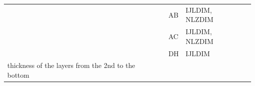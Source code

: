 \begin{longtable}[]{@{}lllll@{}}
\begin{minipage}[t]{0.44\columnwidth}\raggedright
\strut
\end{minipage} & \begin{minipage}[t]{0.15\columnwidth}\raggedright
\strut
\end{minipage} & \begin{minipage}[t]{0.07\columnwidth}\raggedright
AB\strut
\end{minipage} & \begin{minipage}[t]{0.10\columnwidth}\raggedright
IJLDIM, NLZDIM\strut
\end{minipage} & \begin{minipage}[t]{0.10\columnwidth}\raggedright
\strut
\end{minipage}\tabularnewline
\begin{minipage}[t]{0.44\columnwidth}\raggedright
\strut
\end{minipage} & \begin{minipage}[t]{0.15\columnwidth}\raggedright
\strut
\end{minipage} & \begin{minipage}[t]{0.07\columnwidth}\raggedright
AC\strut
\end{minipage} & \begin{minipage}[t]{0.10\columnwidth}\raggedright
IJLDIM, NLZDIM\strut
\end{minipage} & \begin{minipage}[t]{0.10\columnwidth}\raggedright
\strut
\end{minipage}\tabularnewline
\begin{minipage}[t]{0.44\columnwidth}\raggedright
\strut
\end{minipage} & \begin{minipage}[t]{0.15\columnwidth}\raggedright
\strut
\end{minipage} & \begin{minipage}[t]{0.07\columnwidth}\raggedright
DH\strut
\end{minipage} & \begin{minipage}[t]{0.10\columnwidth}\raggedright
IJLDIM\strut
\end{minipage} & \begin{minipage}[t]{0.10\columnwidth}\raggedright
\strut
\end{minipage}\tabularnewline
\begin{minipage}[t]{0.44\columnwidth}\raggedright
thickness of the layers from the 2nd to the bottom\strut
\end{minipage} & \begin{minipage}[t]{0.15\columnwidth}\raggedright

\end{minipage}
\end{longtable}
